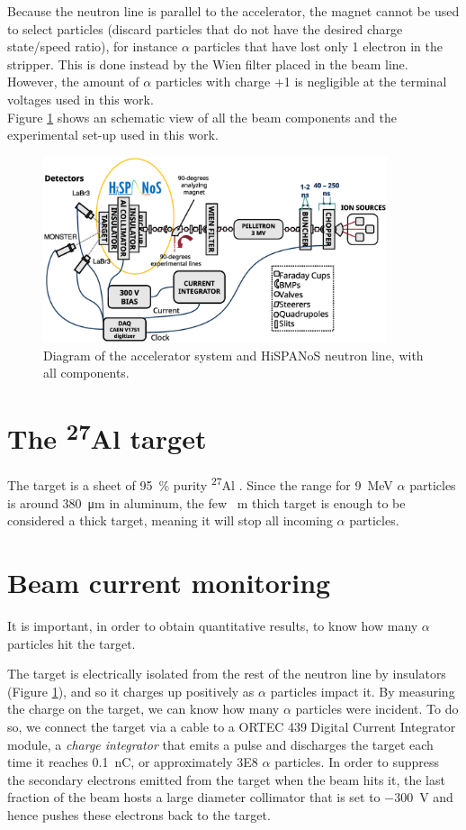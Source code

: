 \documentclass[a4paper,12pt]{report}
\newcommand{\Aliso}{\textsuperscript{27}Al }
\begin{document}
Because the neutron line is parallel to the accelerator, the magnet cannot be used to select particles (discard particles that do not have the desired charge state/speed ratio), for instance $\alpha$ particles that have lost only 1 electron in the stripper.
This is done instead by the Wien filter placed in the beam line.
However, the amount of $\alpha$ particles with charge +1 is negligible at the terminal voltages used in this work.
\\

Figure \ref{tandemdiagrama} shows an schematic view of all the beam components and the experimental set-up used in this work.

\begin{figure}[H]
	\centering
	\includegraphics[width=0.90\textwidth]{tandemdiagrama.eps}
	\caption{Diagram of the accelerator system and HiSPANoS neutron line, with all components.}
	\label{tandemdiagrama}
\end{figure}

\section{The \Aliso target}
The target is a sheet of \qty{95}{\percent} purity \Aliso.
Since the range for 9~MeV $\alpha$ particles is around \qty{380}{\micro\m} in aluminum, the few \unit{\mili\m} thich target is enough to be considered a thick target, meaning it will stop all incoming $\alpha$ particles.
\\

\section{Beam current monitoring}
It is important, in order to obtain quantitative results, to know how many $\alpha$ particles hit the target.

The target is electrically isolated from the rest of the neutron line by insulators (Figure \ref{tandemdiagrama}), and so it charges up positively as $\alpha$ particles impact it.
By measuring the charge on the target, we can know how many $\alpha$ particles were incident.
To do so, we connect the target via a cable to a ORTEC 439 Digital Current Integrator module, a \textit{charge integrator} that emits a pulse and discharges the target each time it reaches \qty{0.1}{\nano\coulomb}, or approximately \num{3E8} $\alpha$ particles.
In order to suppress the secondary electrons emitted from the target when the beam hits it, the last fraction of the beam hosts a large diameter collimator that is set to \qty{-300}{\V} and hence pushes these electrons back to the target.
\end{document}
